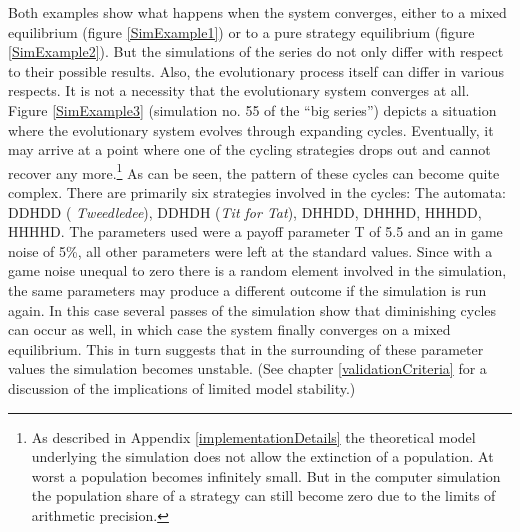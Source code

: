 Both examples show what happens when the system converges, either to a mixed
equilibrium (figure \ref{SimExample1}) or to a pure strategy equilibrium
(figure \ref{SimExample2}). But the simulations of the series do not only
differ with respect to their possible results. Also, the evolutionary process
itself can differ in various respects. It is not a necessity that the
evolutionary system converges at all. Figure \ref{SimExample3} (simulation no.
55 of the ``big series'') depicts a situation where
the evolutionary system evolves through expanding cycles.  Eventually, it may
arrive at a point where one of the cycling strategies drops out and cannot
recover any more.\footnote{As described in Appendix
  \ref{implementationDetails} the theoretical model underlying the simulation
  does not allow the extinction of a population. At worst a population becomes
  infinitely small. But in the computer simulation the population share of a
  strategy can still become zero due to the limits of arithmetic precision.}
As can be seen, the pattern of these cycles can become quite complex. There are
primarily six strategies involved in the cycles: The automata: DDHDD ({\em
  Tweedledee}), DDHDH ({\em Tit for Tat}), DHHDD, DHHHD, HHHDD, HHHHD. The
parameters used were a payoff parameter T of 5.5 and an in game noise of 5\%,
all other parameters were left at the standard values. Since with a game
noise unequal to zero there is a random element involved in the simulation, the
same parameters may produce a different outcome if the simulation is run again.
In this case several passes of the simulation show that diminishing cycles can
occur as well, in which case the system finally converges on a mixed
equilibrium. This in turn suggests that in the surrounding of these parameter
values the simulation becomes unstable. (See chapter \ref{validationCriteria}
for a discussion of the implications of limited model stability.)

